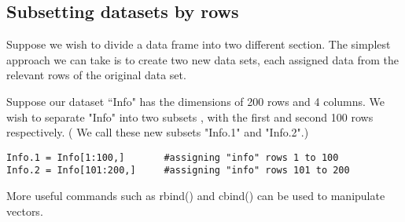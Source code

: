 \documentclass[a4paper,12pt]{article}
\begin{document}
\newpage





\subsection{Subsetting datasets by rows}

Suppose we wish to divide a data frame into two different section. The simplest approach we can take is to create two new data sets, each assigned data from the relevant rows of the original data set.

Suppose our dataset ``Info" has the dimensions of 200 rows and 4 columns. We wish to separate "Info" into two subsets , with the first and second 100 rows respectively. ( We call these new subsets "Info.1" and "Info.2".)
\begin{verbatim}
Info.1 = Info[1:100,]		#assigning "info" rows 1 to 100
Info.2 = Info[101:200,]		#assigning "info" rows 101 to 200
\end{verbatim}

More useful commands such as rbind() and cbind()  can be used to manipulate vectors.
\end{document}
